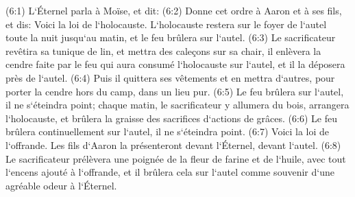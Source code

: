 \verse (6:1) L`Éternel parla à Moïse, et dit: 
\verse (6:2) Donne cet ordre à Aaron et à ses fils, et dis: Voici la loi de l`holocauste. L`holocauste restera sur le foyer de l`autel toute la nuit jusqu`au matin, et le feu brûlera sur l`autel. 
\verse (6:3) Le sacrificateur revêtira sa tunique de lin, et mettra des caleçons sur sa chair, il enlèvera la cendre faite par le feu qui aura consumé l`holocauste sur l`autel, et il la déposera près de l`autel. 
\verse (6:4) Puis il quittera ses vêtements et en mettra d`autres, pour porter la cendre hors du camp, dans un lieu pur. 
\verse (6:5) Le feu brûlera sur l`autel, il ne s`éteindra point; chaque matin, le sacrificateur y allumera du bois, arrangera l`holocauste, et brûlera la graisse des sacrifices d`actions de grâces. 
\verse (6:6) Le feu brûlera continuellement sur l`autel, il ne s`éteindra point. 
\verse (6:7) Voici la loi de l`offrande. Les fils d`Aaron la présenteront devant l`Éternel, devant l`autel. 
\verse (6:8) Le sacrificateur prélèvera une poignée de la fleur de farine et de l`huile, avec tout l`encens ajouté à l`offrande, et il brûlera cela sur l`autel comme souvenir d`une agréable odeur à l`Éternel. 
